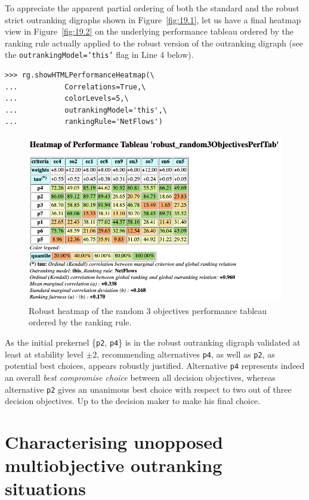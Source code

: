 To appreciate the apparent partial ordering of both the standard and the robust strict outranking digraphs shown in Figure~\vref{fig:19.1}, let us have a final heatmap view in Figure~\vref{fig:19.2} on the underlying performance tableau ordered by the \NetFlows ranking rule actually applied to the robust version of the outranking digraph (see the \texttt{outrankingModel='this'} flag in Line 4 below).
\begin{lstlisting}[caption={Computing a robust performance heatmap view},label=list:19.9]
>>> rg.showHTMLPerformanceHeatmap(\
...           Correlations=True,\
...           colorLevels=5,\
...           outrankingModel='this',\
...           rankingRule='NetFlows')
\end{lstlisting}
\begin{figure}[ht]
\includegraphics[width=\hsize]{Figures/19-2-robustHeatmap.png}
\caption{Robust heatmap of the random 3 objectives performance tableau ordered by the \NetFlows ranking rule.} 
\label{fig:19.2}       %
\end{figure}

As the initial prekernel \{\texttt{p2}, \texttt{p4}\} is in the robust outranking digraph validated at least at stability level $\pm 2$, recommending alternatives \texttt{p4}, as well as \texttt{p2}, as potential best choices, appears robustly justified. Alternative \texttt{p4} represents indeed an overall \emph{best compromise choice} between all decision objectives, whereas alternative \texttt{p2} gives an unanimous best choice with respect to two out of three decision objectives. Up to the decision maker to make his final choice.

\section{Characterising unopposed multiobjective outranking situations}
\label{sec:19.5}

